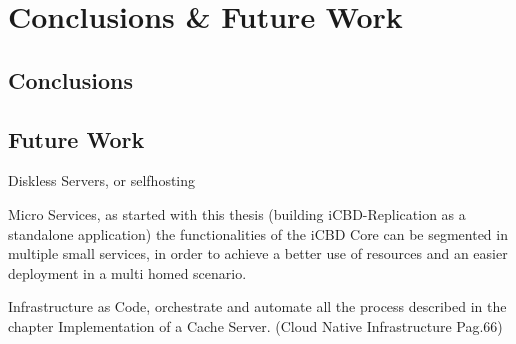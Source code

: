 \chapter{Conclusions \& Future Work}
\label{cha:conclusion}

\section{Conclusions}
\label{sec:conclusions}

\section{Future Work}
\label{sec:future_work}

Diskless Servers, or selfhosting 

Micro Services, as started with this thesis (building iCBD-Replication as a standalone application) the functionalities of the iCBD Core can be segmented in multiple small services, in order to achieve a better use of resources and an easier deployment in a multi homed scenario.

Infrastructure as Code, orchestrate and automate all the process described in the chapter Implementation of a Cache Server. (Cloud Native Infrastructure Pag.66)

